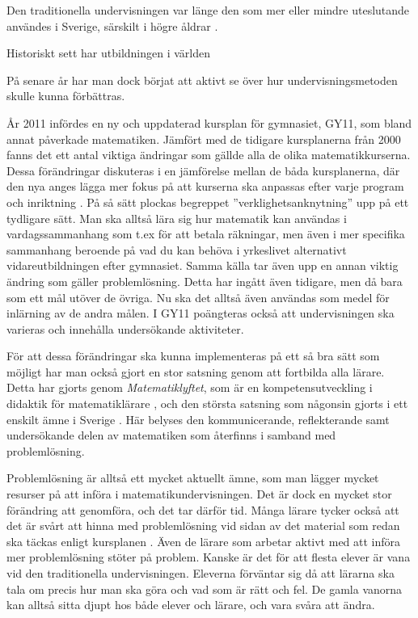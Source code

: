 
\textcolor{lila}{Den traditionella undervisningen var länge den som mer eller mindre uteslutande användes i Sverige, särskilt i högre åldrar \cite{Namnaren}.}

Historiskt sett har utbildningen i världen 

\textcolor{lila}{På senare år har man dock börjat att aktivt se över hur undervisningsmetoden skulle kunna förbättras.}

\textcolor{lila}{År 2011 infördes en ny och uppdaterad kursplan för gymnasiet, GY11, som bland annat påverkade matematiken. Jämfört med de tidigare kursplanerna från 2000 fanns det ett antal viktiga ändringar som gällde alla de olika matematikkurserna. 
Dessa förändringar diskuteras i en jämförelse mellan de båda kursplanerna, där den nya anges lägga mer fokus på att kurserna ska anpassas efter varje program och inriktning \cite{GY00-GY11}. På så sätt plockas begreppet ''verklighetsanknytning'' upp på ett tydligare sätt. Man ska alltså lära sig hur matematik kan användas i vardagssammanhang som t.ex för att betala räkningar, men även i mer specifika sammanhang beroende på vad du kan behöva i yrkeslivet alternativt vidareutbildningen efter gymnasiet. 
Samma källa tar även upp en annan viktig ändring som gäller problemlösning. Detta har ingått även tidigare, men då bara som ett mål utöver de övriga. Nu ska det alltså även användas som medel för inlärning av de andra målen. I GY11 poängteras också att undervisningen ska varieras och innehålla undersökande aktiviteter.}

\textcolor{lila}{För att dessa förändringar ska kunna implementeras på ett så bra sätt som möjligt har man också gjort en stor satsning genom att fortbilda alla lärare. Detta har gjorts genom \textsl{Matematiklyftet}, som är en kompetensutveckling i didaktik för matematiklärare \cite{Namnaren}, och den största satsning som någonsin gjorts i ett enskilt ämne i Sverige \cite{mattelyftet}. Här belyses den kommunicerande, reflekterande samt undersökande delen av matematiken som återfinns i samband med problemlösning.}
            
\textcolor{lila}{Problemlösning är alltså ett mycket aktuellt ämne, som man lägger mycket resurser på att införa i matematikundervisningen. Det är dock en mycket stor förändring att genomföra, och det tar därför tid. Många lärare tycker också att det är svårt att hinna med problemlösning vid sidan av det material som redan ska täckas enligt kursplanen \cite{2016Senare}. Även de lärare som arbetar aktivt med att införa mer problemlösning stöter på problem. Kanske är det för att flesta elever är vana vid den traditionella undervisningen. Eleverna förväntar sig då att lärarna ska tala om precis hur man ska göra och vad som är rätt och fel. De gamla vanorna kan alltså sitta djupt hos både elever och lärare, och vara svåra att ändra.}

